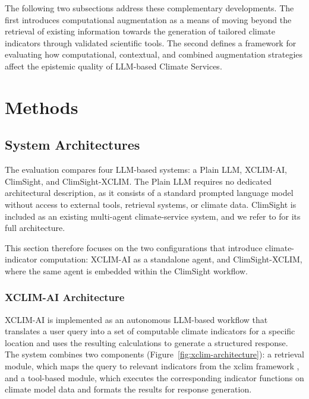The following two subsections address these complementary developments. The first introduces computational augmentation as a means of moving beyond the retrieval of existing information towards the generation of tailored climate indicators through validated scientific tools. The second defines a framework for evaluating how computational, contextual, and combined augmentation strategies affect the epistemic quality of LLM-based Climate Services.


\section{Methods}

\subsection{System Architectures}

The evaluation compares four LLM-based systems: a Plain LLM, XCLIM-AI, ClimSight, and ClimSight-XCLIM. The Plain LLM requires no dedicated architectural description, as it consists of a standard prompted language model without access to external tools, retrieval systems, or climate data. ClimSight is included as an existing multi-agent climate-service system, and we refer to \citet{kuznetsov_transforming_2025} for its full architecture.

This section therefore focuses on the two configurations that introduce climate-indicator computation: XCLIM-AI as a standalone agent, and ClimSight-XCLIM, where the same agent is embedded within the ClimSight workflow.

\subsubsection{XCLIM-AI Architecture} \label{xclim-architecture}

XCLIM-AI is implemented as an autonomous LLM-based workflow that translates a user query into a set of computable climate indicators for a specific location and uses the resulting calculations to generate a structured response. The system combines two components (Figure~\ref{fig:xclim-architecture}): a retrieval module, which maps the query to relevant indicators from the xclim framework \citep{bourgault_xclim_2023}, and a tool-based module, which executes the corresponding indicator functions on climate model data and formats the results for response generation.

